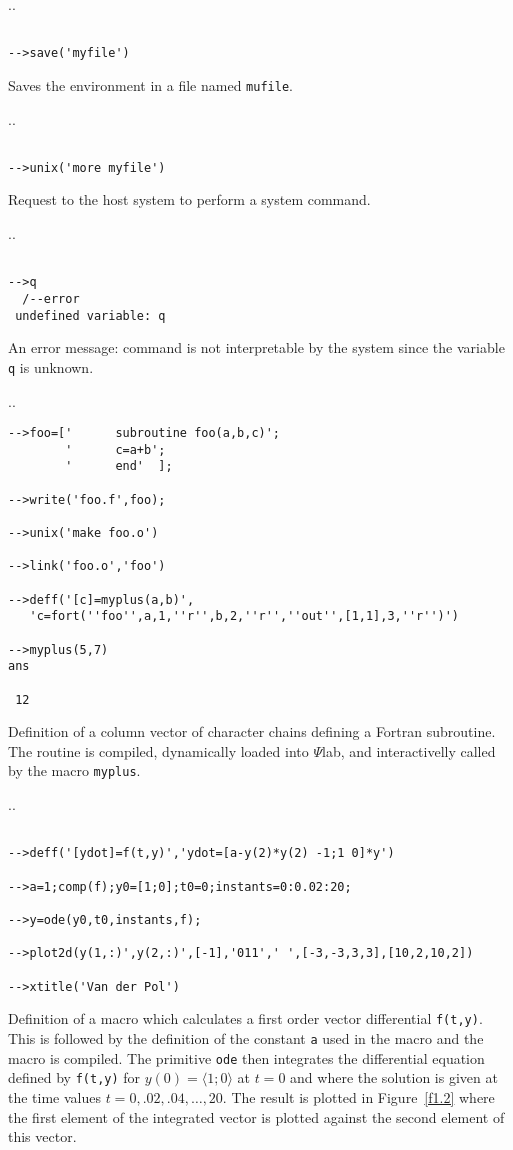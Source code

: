 \noindent.\dotfill.
\begin{verbatim}

-->save('myfile')
\end{verbatim}
Saves the environment in a file named {\tt mufile}.

\noindent.\dotfill.
\begin{verbatim}

-->unix('more myfile')
\end{verbatim}
Request to the host system to perform a system command.

\noindent.\dotfill.
\begin{verbatim}

-->q
  /--error 
 undefined variable: q       
\end{verbatim}
An error message: command is not interpretable by the system since the
variable {\tt q} is unknown.

\noindent.\dotfill.
\begin{verbatim}
-->foo=['      subroutine foo(a,b,c)';
        '      c=a+b';
        '      end'  ];

-->write('foo.f',foo);

-->unix('make foo.o') 

-->link('foo.o','foo')  

-->deff('[c]=myplus(a,b)',
   'c=fort(''foo'',a,1,''r'',b,2,''r'',''out'',[1,1],3,''r'')')

-->myplus(5,7)
ans

 12
\end{verbatim}
Definition of a column vector of character chains defining a Fortran
subroutine. The routine is compiled, dynamically loaded into $\Psi$lab,
and interactivelly called by the macro {\tt myplus}.

\noindent.\dotfill.
\begin{verbatim}
 
-->deff('[ydot]=f(t,y)','ydot=[a-y(2)*y(2) -1;1 0]*y')
 
-->a=1;comp(f);y0=[1;0];t0=0;instants=0:0.02:20;
 
-->y=ode(y0,t0,instants,f);
 
-->plot2d(y(1,:)',y(2,:)',[-1],'011',' ',[-3,-3,3,3],[10,2,10,2])
 
-->xtitle('Van der Pol')
\end{verbatim}
Definition of a macro which calculates a first order vector differential
{\tt f(t,y)}.  This is followed by the definition of the constant {\tt a}
used in the macro and the macro is compiled.  The primitive {\tt ode}
then integrates the differential equation defined by {\tt f(t,y)}
for $y(0)=\langle 1;0\rangle$ at $t=0$ and where the solution is given
at the time values $t=0,.02,.04,\ldots,20$.  The result is plotted in
Figure~\ref{f1.2} where the first element of the integrated vector is 
plotted against the second element of this vector.

